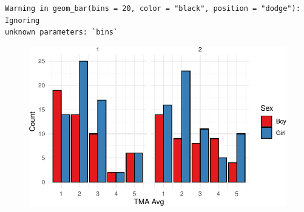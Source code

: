 \documentclass[
  letterpaper,
  DIV=11,
  numbers=noendperiod]{scrartcl}
\begin{document}
\begin{verbatim}
Warning in geom_bar(bins = 20, color = "black", position = "dodge"): Ignoring
unknown parameters: `bins`
\end{verbatim}

\begin{figure}[H]

{\centering \includegraphics{mathAnx_eda1_files/figure-pdf/unnamed-chunk-6-1.pdf}

}

\end{figure}
\end{document}
